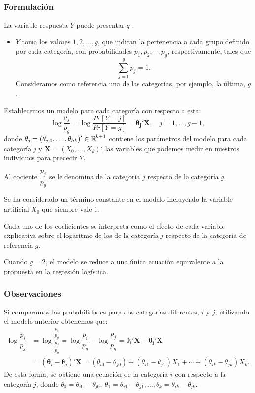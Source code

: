 \subsubsection{Formulación}
La variable respuesta $Y$ puede presentar $g$ .
\begin{itemize}
	\item $Y$ toma los valores $1,2,\dots,g$, que indican la pertenencia a cada grupo definido por cada categoría, con probabilidades $p_1,p_2,\cdots,p_g$, respectivamente, tales que \[ \sum_{j=1}^{g}p_j=1. \]
	Consideramos como referencia una de las categorías, por ejemplo, la última, $g$.
\end{itemize}
Establecemos un modelo  para cada categoría con respecto a esta: \[ \log\dfrac{p_j}{p_g}=\log\dfrac{Pr[Y=j]}{Pr[Y=g]}=\mathbf{\theta_j'X},\quad j=1,\dots,g-1, \] donde $\mathbf{\theta}_j=(\theta_{j,0},\dots,\theta_{hk})'\in\operatorname{\mathbb{R}}^{k+1}$ contiene los parámetros del modelo para cada categoría $j$ y $\mathbf{X}=(X_0,\dots,X_k)'$ las variables que podemos medir en nuestros individuos para predecir $Y$.

Al cociente $\dfrac{p_j}{p_g}$ se le denomina  de la categoría $j$ respecto de la categoría $g$.

Se ha considerado un término constante en el modelo incluyendo la variable artificial $X_0$ que siempre vale 1.

Cada uno de los coeficientes se interpreta como el efecto de cada variable explicativa sobre el logaritmo de los  de la categoría $j$ respecto de la categoría de referencia $g$.

Cuando $g=2$, el modelo se reduce a una única ecuación equivalente a la propuesta en la regresión logística.
\subsubsection{Observaciones}
Si comparamos las probabilidades para dos categorías diferentes, $i$ y $j$, utilizando el modelo anterior obtenemos que: \[ \begin{aligned}
	\log\dfrac{p_i}{p_j}&=\log\dfrac{\frac{p_i}{p_g}}{\frac{p_j}{p_g}}=\log\dfrac{p_i}{p_g}-\log\dfrac{p_j}{p_g}=\mathbf{\theta_i'X-\theta_j'X}\\
	&=(\mathbf{\theta}_i-\mathbf{\theta}_j)'\mathbf{X}=(\theta_{i0}-\theta_{j0})+(\theta_{i1}-\theta_{j1})X_1+\cdots+(\theta_{ik}-\theta_{jk})X_k.
\end{aligned} \]
De esta forma, se obtiene una ecuación  de la categoría $i$ con respecto a la categoría $j$, donde $\theta_0=\theta_{i0}-\theta_{j0},\:\theta_1=\theta_{i1}-\theta_{j1},\dots,\theta_k=\theta_{ik}-\theta_{jk}.$

